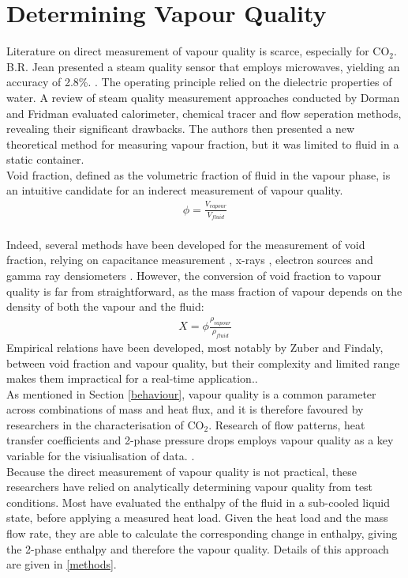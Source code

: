 \documentclass{report}
\begin{document}
\section{Determining Vapour Quality}
Literature on direct measurement of vapour quality is scarce, especially for CO$_2$. B.R. Jean presented a steam quality sensor that employs microwaves, yielding an accuracy of 2.8\%. \cite{Jean 2007}. The operating principle relied on the dielectric properties of water. A review of steam quality measurement approaches conducted by Dorman and Fridman \cite{Dorfman 2006} evaluated calorimeter, chemical tracer and flow seperation methods, revealing their significant drawbacks. The authors then presented a new theoretical method for measuring vapour fraction, but it was limited to fluid in a static container. \\
Void fraction, defined as the volumetric fraction of fluid in the vapour phase, is an intuitive candidate for an inderect measurement of vapour quality. 
\begin{eqnarray}
\phi =\frac{V_{vapour}}{V_{fluid}}
\end{eqnarray}\\
Indeed, several methods have been developed for the measurement of void fraction, relying on capacitance measurement \cite{Beker 2005}, x-rays \cite{Bauer 2012}, electron sources \cite{Augyrond 2001} and gamma ray densiometers \cite{Zhao 2013}. However, the conversion of void fraction to vapour quality is far from straightforward, as the mass fraction of vapour depends on the density of both the vapour and the fluid:
\begin{eqnarray}
X =\phi\frac{\rho_{vapour}}{\rho_{fluid}}
\end{eqnarray}
Empirical relations have been developed, most notably by Zuber and Findaly, between void fraction and vapour quality, but their complexity and limited range makes them impractical for a real-time application.\cite{lecture}.\\
As mentioned in Section \ref{behaviour}, vapour quality is a common parameter across combinations of mass and heat flux, and it is therefore favoured by researchers in the characterisation of CO$_2$. Research of flow patterns, heat transfer coefficients and 2-phase pressure drops employs vapour quality as a key variable for the visiualisation of data. \cite{Cheng 2008}\cite{Mastrullo 2009a}.\\
Because the direct measurement of vapour quality is not practical, these researchers have relied on analytically determining vapour quality from test conditions. Most have evaluated the enthalpy of the fluid in a sub-cooled liquid state, before applying a measured heat load. Given the heat load and the mass flow rate, they are able to calculate the corresponding change in enthalpy, giving the 2-phase enthalpy and therefore the vapour quality. \cite{Mastrullo 2009c} \cite{Wu 2011} \cite{Yun 2005} Details of this approach are given in \ref{methods}.
\end{document}
